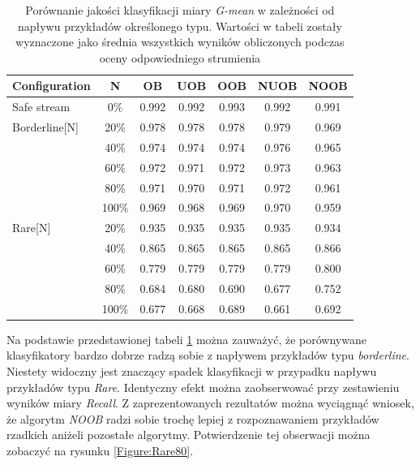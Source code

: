 \begin{table}[ht]
\centering\small%
\renewcommand{\arraystretch}{1.5} 
\begin{tabular}{l c c c c c c}
\toprule
Configuration & N & OB & UOB & OOB & NUOB & NOOB \\
\midrule
Safe stream & 0\% & 0.992 & 0.992 & 0.993 & 0.992 & 0.991 \\
Borderline[N] & 20\% & 0.978 & 0.978 & 0.978 & 0.979 & 0.969 \\
& 40\% & 0.974 & 0.974 & 0.974 & 0.976 & 0.965 \\
& 60\% & 0.972 & 0.971 & 0.972 & 0.973 & 0.963 \\
& 80\% & 0.971 & 0.970 & 0.971 & 0.972 & 0.961 \\
& 100\% & 0.969 & 0.968 & 0.969 & 0.970 & 0.959 \\
Rare[N] & 20\% & 0.935 & 0.935 & 0.935 & 0.935 & 0.934 \\
& 40\% & 0.865 & 0.865 & 0.865 & 0.865 & 0.866 \\
& 60\% & 0.779 & 0.779 & 0.779 & 0.779 & 0.800 \\
& 80\% & 0.684 & 0.680 & 0.690 & 0.677 & 0.752 \\
& 100\% & 0.677 & 0.668 & 0.689 & 0.661 & 0.692 \\
\bottomrule
\end{tabular}
\caption{Porównanie jakości klasyfikacji miary \textit{G-mean} w zależności od napływu przykładów określonego typu. Wartości w tabeli zostały wyznaczone jako średnia wszystkich wyników obliczonych podczas oceny odpowiedniego strumienia}\label{Tab:BorderlineRare}
\end{table}

\noindent Na podstawie przedstawionej tabeli \ref{Tab:BorderlineRare} można zauważyć, że porównywane klasyfikatory bardzo dobrze radzą sobie z napływem przykładów typu \textit{borderline}. Niestety widoczny jest znaczący spadek klasyfikacji w przypadku napływu przykładów typu \textit{Rare}. Identyczny efekt można zaobserwować przy zestawieniu wyników miary \textit{Recall}. Z zaprezentowanych rezultatów można wyciągnąć wniosek, że algorytm \textit{NOOB} radzi sobie trochę lepiej z rozpoznawaniem przykładów rzadkich aniżeli pozostałe algorytmy. Potwierdzenie tej obserwacji można zobaczyć na rysunku \ref{Figure:Rare80}.

\newpage

